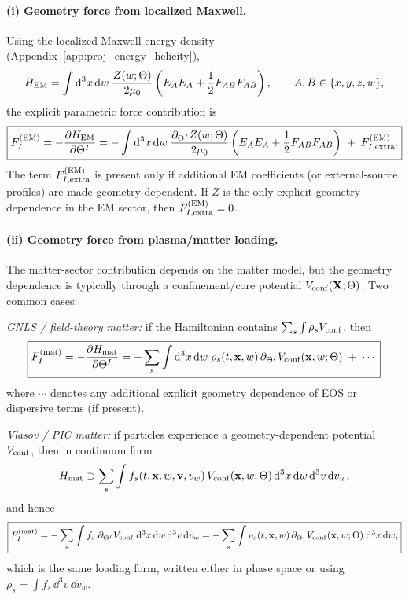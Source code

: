 \documentclass[11pt]{article}
\begin{document}
\paragraph{(i) Geometry force from localized Maxwell.}
Using the localized Maxwell energy density (Appendix~\ref{app:proj_energy_helicity}),
\begin{equation}
H_{\rm EM}
=
\int \dd^3x\,\dd w\;
\frac{Z(w;\Theta)}{2\mu_0}
\left(
E_AE_A+\frac12 F_{AB}F_{AB}
\right),
\qquad A,B\in\{x,y,z,w\},
\end{equation}
the explicit parametric force contribution is
\begin{equation}
\boxed{
F_I^{({\rm EM})}
=
-\frac{\partial H_{\rm EM}}{\partial \Theta^I}
=
-\int \dd^3x\,\dd w\;
\frac{\partial_{\Theta^I}Z(w;\Theta)}{2\mu_0}
\left(
E_AE_A+\frac12 F_{AB}F_{AB}
\right)
\;+\;F_{I,\rm extra}^{({\rm EM})}.
}
\label{eq:app_FI_EM}
\end{equation}
The term \(F_{I,\rm extra}^{({\rm EM})}\) is present only if additional EM coefficients
(or external-source profiles) are made geometry-dependent. If \(Z\) is the only explicit
geometry dependence in the EM sector, then \(F_{I,\rm extra}^{({\rm EM})}=0\).

\paragraph{(ii) Geometry force from plasma/matter loading.}
The matter-sector contribution depends on the matter model, but the geometry dependence is
typically through a confinement/core potential \(V_{\rm conf}(\mathbf{X};\Theta)\).
Two common cases:

\emph{GNLS / field-theory matter:} if the Hamiltonian contains \(\sum_s \int \rho_s V_{\rm conf}\),
then
\begin{equation}
\boxed{
F_I^{({\rm mat})}
=
-\frac{\partial H_{\rm mat}}{\partial \Theta^I}
=
-\sum_s \int \dd^3x\,\dd w\;
\rho_s(t,\mathbf{x},w)\,\partial_{\Theta^I}V_{\rm conf}(\mathbf{x},w;\Theta)
\;+\;\cdots
}
\label{eq:app_FI_mat_GNLS}
\end{equation}
where \(\cdots\) denotes any additional explicit geometry dependence of EOS or dispersive terms
(if present).

\emph{Vlasov / PIC matter:} if particles experience a geometry-dependent potential \(V_{\rm conf}\),
then in continuum form
\begin{equation}
H_{\rm mat}\supset \sum_s \int f_s(t,\mathbf{x},w,\mathbf{v},v_w)\,V_{\rm conf}(\mathbf{x},w;\Theta)\,
\dd^3x\,\dd w\,\dd^3v\,\dd v_w,
\end{equation}
and hence
\begin{equation}
\boxed{
F_I^{({\rm mat})}
=
-\sum_s \int f_s\;\partial_{\Theta^I}V_{\rm conf}\;
\dd^3x\,\dd w\,\dd^3v\,\dd v_w
=
-\sum_s \int \rho_s(t,\mathbf{x},w)\,\partial_{\Theta^I}V_{\rm conf}(\mathbf{x},w;\Theta)\;
\dd^3x\,\dd w,
}
\label{eq:app_FI_mat_PIC}
\end{equation}
which is the same loading form, written either in phase space or using \(\rho_s=\int f_s\,\dd^3v\,\dd v_w\).
\end{document}
